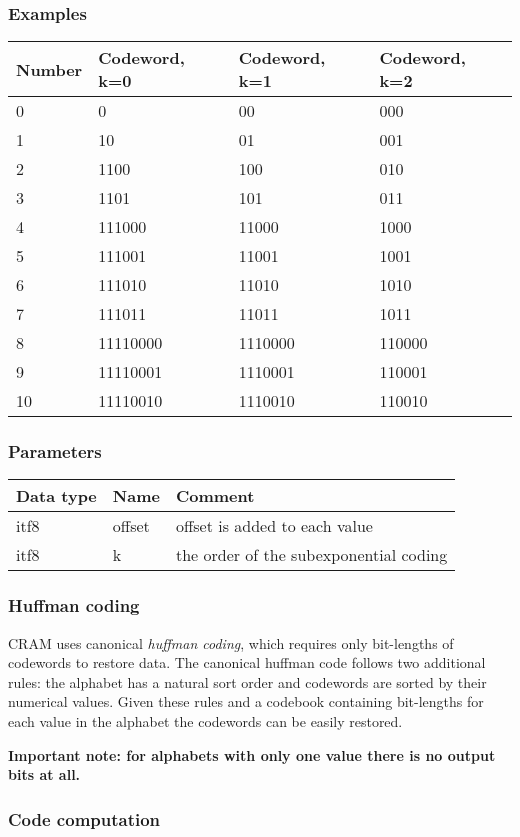 \documentclass[a4paper]{article}
\begin{document}
\subsubsection*{Examples}

\begin{tabular}{|>{\raggedright}p{105pt}|>{\raggedright}p{105pt}|>{\raggedright}p{105pt}|>{\raggedright}p{105pt}|}
\hline
\textbf{Number} & \textbf{Codeword, k=0} & \textbf{Codeword, k=1} & \textbf{Codeword, 
k=2}\tabularnewline
\hline
0 & 0 & 00 & 000\tabularnewline
\hline
1 & 10 & 01 & 001\tabularnewline
\hline
2 & 1100 & 100 & 010\tabularnewline
\hline
3 & 1101 & 101 & 011\tabularnewline
\hline
4 & 111000 & 11000 & 1000\tabularnewline
\hline
5 & 111001 & 11001 & 1001\tabularnewline
\hline
6 & 111010 & 11010 & 1010\tabularnewline
\hline
7 & 111011 & 11011 & 1011\tabularnewline
\hline
8 & 11110000 & 1110000 & 110000\tabularnewline
\hline
9 & 11110001 & 1110001 & 110001\tabularnewline
\hline
10 & 11110010 & 1110010 & 110010\tabularnewline
\hline
\end{tabular}

\subsubsection*{Parameters}

\begin{tabular}{|>{\raggedright}p{100pt}|>{\raggedright}p{100pt}|>{\raggedright}p{230pt}|}
\hline
\textbf{Data type} & \textbf{Name} & \textbf{Comment}
\tabularnewline
\hline
itf8 & offset & offset is added to each value\tabularnewline
\hline
itf8 & k & the order of the subexponential coding\tabularnewline
\hline
\end{tabular}

\subsubsection*{Huffman coding}

CRAM uses canonical \emph{huffman coding}, which requires only bit-lengths of codewords 
to restore data. The canonical huffman code follows two additional rules: the alphabet 
has a natural sort order and codewords are sorted by their numerical values. Given 
these rules and a codebook containing bit-lengths for each value in the alphabet 
the codewords can be easily restored. 

\textbf{Important note: for alphabets with only one value there is no output bits 
at all. }

\subsubsection*{Code computation}
\end{document}
